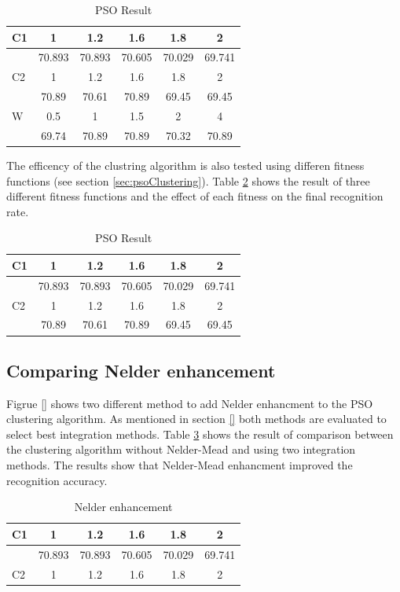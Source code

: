 \documentclass[a4paper,twoside]{article}
\begin{document}
\begin{table}
	\centering
		\caption{PSO Result }
	\label{tab:system}
		\begin{tabular}{|l|c|c|c|c|c|}
		 \hline
C1 &	1	&1.2&	1.6&	1.8 &	2	\\ \hline
	&70.893	&70.893	&70.605	&70.029	&69.741 \\  \hline
C2	&	1	&1.2&	1.6&	1.8 &	2	\\ \hline
	&70.89	&70.61	&70.89	&69.45	&69.45 \\ \hline
W	&0.5&	1	&1.5	&2&	4	\\ \hline
	&69.74	&70.89&	70.89	&70.32&	70.89	\\ \hline
\end{tabular}
\end{table}


The efficency of the clustring algorithm is also  tested using differen fitness functions (see section \ref{sec:psoClustering}). Table \ref{tab:fitness}  shows the result of three different fitness functions and the effect of each fitness on the final recognition rate.


\begin{table}
	\centering
		\caption{PSO Result }
	\label{tab:fitness}
		\begin{tabular}{|l|c|c|c|c|c|}
		 \hline
C1 &	1	&1.2&	1.6&	1.8 &	2	\\ \hline
	&70.893	&70.893	&70.605	&70.029	&69.741 \\  \hline
C2	&	1	&1.2&	1.6&	1.8 &	2	\\ \hline
	&70.89	&70.61	&70.89	&69.45	&69.45 \\ \hline

\end{tabular}
\end{table}

\subsection{ Comparing Nelder enhancement}
\label{sec:comparingSystems}
Figrue \ref{} shows two different method to add Nelder enhancment to the PSO clustering algorithm. As mentioned in section \ref{} both methods are evaluated to select best integration methods.  Table \ref{tab:nelder} shows the result of comparison between the clustering algorithm without Nelder-Mead and using two integration methods. The results show that Nelder-Mead enhancment improved the recognition accuracy. %

\begin{table}
	\centering
		\caption{ Nelder enhancement  }
	\label{tab:nelder}
		\begin{tabular}{|l|c|c|c|c|c|}
		 \hline
C1 &	1	&1.2&	1.6&	1.8 &	2	\\ \hline
	&70.893	&70.893	&70.605	&70.029	&69.741 \\  \hline
C2	&	1	&1.2&	1.6&	1.8 &	2	\\ \hline

\end{tabular}

\end{table}
\end{document}
